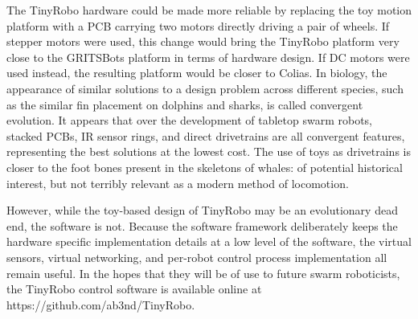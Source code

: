 \documentclass[]{article}
\begin{document}
The TinyRobo hardware could be made more reliable by replacing the toy motion platform with a PCB carrying two motors directly driving a pair of wheels. 
If stepper motors were used, this change would bring the TinyRobo platform very close to the GRITSBots platform in terms of hardware design. 
If DC motors were used instead, the resulting platform would be closer to Colias. 
In biology, the appearance of similar solutions to a design problem across different species, such as the similar fin placement on dolphins and sharks, is called convergent evolution. 
It appears that over the development of tabletop swarm robots, stacked PCBs, IR sensor rings, and direct drivetrains are all convergent features, representing the best solutions at the lowest cost. 
The use of toys as drivetrains is closer to the foot bones present in the skeletons of whales: of potential historical interest, but not terribly relevant as a modern method of locomotion. 

However, while the toy-based design of TinyRobo may be an evolutionary dead end, the software is not.
Because the software framework deliberately keeps the hardware specific implementation details at a low level of the software, the virtual sensors, virtual networking, and per-robot control process implementation all remain useful. 
In the hopes that they will be of use to future swarm roboticists, the TinyRobo control software is available online at https://github.com/ab3nd/TinyRobo.





 






\end{document}
